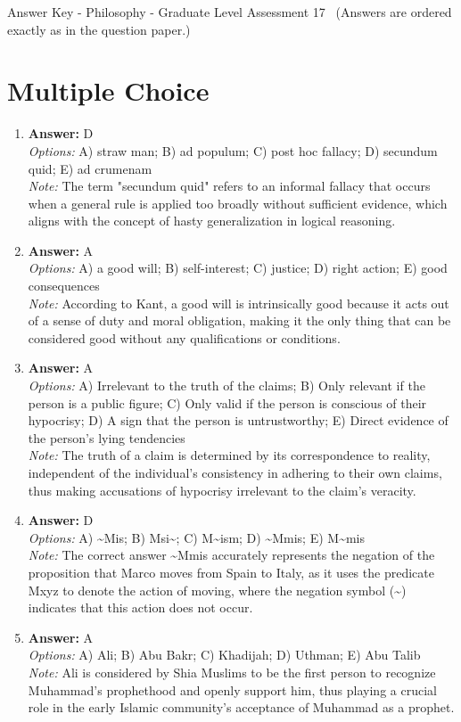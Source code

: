\documentclass[12pt]{article}
\begin{document}
\begin{center}
Answer Key - Philosophy - Graduate Level Assessment 17 \
\small (Answers are ordered exactly as in the question paper.)
\end{center}

\section*{Multiple Choice}
\begin{enumerate}[label=\arabic*.]
\item \textbf{Answer:} D
\\ \textit{Options:} A) straw man; B) ad populum; C) post hoc fallacy; D) secundum quid; E) ad crumenam
\\ \textit{Note:} The term "secundum quid" refers to an informal fallacy that occurs when a general rule is applied too broadly without sufficient evidence, which aligns with the concept of hasty generalization in logical reasoning.
\item \textbf{Answer:} A
\\ \textit{Options:} A) a good will; B) self-interest; C) justice; D) right action; E) good consequences
\\ \textit{Note:} According to Kant, a good will is intrinsically good because it acts out of a sense of duty and moral obligation, making it the only thing that can be considered good without any qualifications or conditions.
\item \textbf{Answer:} A
\\ \textit{Options:} A) Irrelevant to the truth of the claims; B) Only relevant if the person is a public figure; C) Only valid if the person is conscious of their hypocrisy; D) A sign that the person is untrustworthy; E) Direct evidence of the person's lying tendencies
\\ \textit{Note:} The truth of a claim is determined by its correspondence to reality, independent of the individual's consistency in adhering to their own claims, thus making accusations of hypocrisy irrelevant to the claim's veracity.
\item \textbf{Answer:} D
\\ \textit{Options:} A) \textasciitilde{}Mis; B) Msi\textasciitilde{}; C) M\textasciitilde{}ism; D) \textasciitilde{}Mmis; E) M\textasciitilde{}mis
\\ \textit{Note:} The correct answer \textasciitilde{}Mmis accurately represents the negation of the proposition that Marco moves from Spain to Italy, as it uses the predicate Mxyz to denote the action of moving, where the negation symbol (\textasciitilde{}) indicates that this action does not occur.
\item \textbf{Answer:} A
\\ \textit{Options:} A) Ali; B) Abu Bakr; C) Khadijah; D) Uthman; E) Abu Talib
\\ \textit{Note:} Ali is considered by Shia Muslims to be the first person to recognize Muhammad's prophethood and openly support him, thus playing a crucial role in the early Islamic community's acceptance of Muhammad as a prophet.
\end{enumerate}
\end{document}
